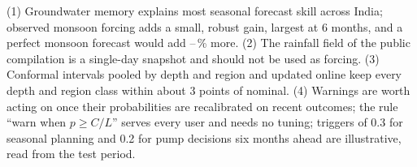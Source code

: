 \documentclass[hess, manuscript]{copernicus}
\begin{document}
\conclusions

(1) Groundwater memory explains most seasonal forecast skill across India; observed monsoon forcing adds a small, robust gain,
largest at 6 months, and a perfect monsoon forecast would add \oracleMin--\oracleMax\,\% more. (2) The rainfall field of the
public compilation is a single-day snapshot and should not be used as forcing. (3) Conformal intervals pooled by depth and region
and updated online keep every depth and region class within about 3 points of nominal. (4) Warnings are worth acting on once their
probabilities are recalibrated on recent outcomes; the rule ``warn when $p \ge C/L$'' serves every user and needs no tuning; triggers of 0.3 for
seasonal planning and 0.2 for pump decisions six months ahead are illustrative, read from the test period.






\end{document}

